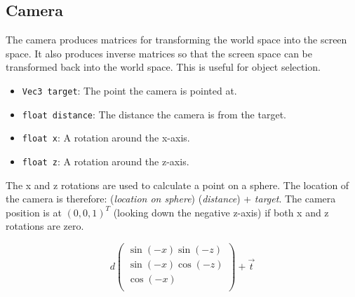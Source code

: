 \documentclass[10pt]{article}
\begin{document}
\subsection{Camera}
The camera produces matrices for transforming the world space into the screen space. It also produces inverse matrices so that the screen space can be transformed back into the world space. This is useful for object selection.
\begin{itemize}
\item \texttt{Vec3 target}: The point the camera is pointed at.
\item \texttt{float distance}: The distance the camera is from the target.
\item \texttt{float x}: A rotation around the x-axis.
\item \texttt{float z}: A rotation around the z-axis.
\end{itemize}
The x and z rotations are used to calculate a point on a sphere. The location of the camera is therefore: (\textit{location on sphere}) (\textit{distance}) + \textit{target}. The camera position is at $ (0, 0, 1)^T $ (looking down the negative z-axis) if both x and z rotations are zero.

\[
d\begin{pmatrix}
\sin(-x)\sin(-z)\\
\sin(-x)\cos(-z)\\
\cos(-x)\\
\end{pmatrix} + \vec{t}
\]
\end{document}
